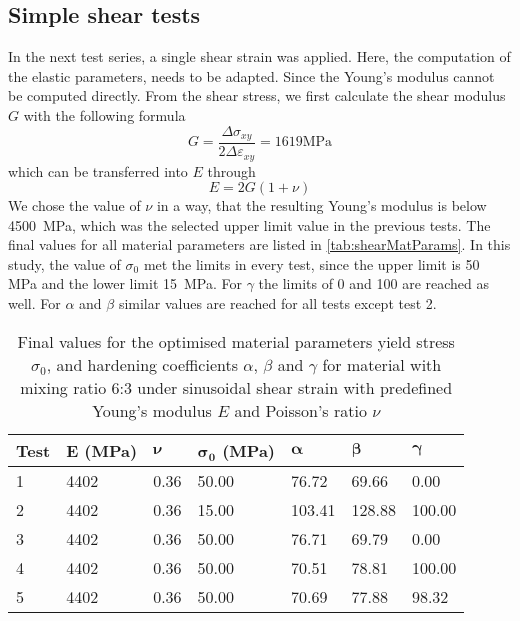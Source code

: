 \subsection{Simple shear tests}
In the next test series, a single shear strain was applied. Here, the computation of the elastic parameters, needs to be adapted. Since the Young's modulus cannot be computed directly. From the shear stress, we first calculate the shear modulus $G$ with the following formula
\begin{equation}
    G = \frac{\Delta\sigma_{xy}}{2\Delta\varepsilon_{xy}} = 1619 \text{MPa}
\end{equation}
which can be transferred into $E$ through
\begin{equation}
    E = 2G(1+\nu) 
\end{equation}
We chose the value of $\nu$ in a way, that the resulting Young's modulus is below 4500 MPa, which was the selected upper limit value in the previous tests. The final values for all material parameters are listed in \autoref{tab:shearMatParams}. In this study, the value of $\sigma_0$ met the limits in every test, since the upper limit is 50 MPa and the lower limit 15 MPa. For $\gamma$ the limits of 0 and 100 are reached as well. For $\alpha$ and $\beta$ similar values are reached for all tests except test 2. 

\begin{table}[h!]
\centering
\caption{Final values for the optimised material parameters yield stress $\sigma_0$, and hardening coefficients $\alpha$, $\beta$ and $\gamma$ for material with mixing ratio 6:3 under sinusoidal shear strain with predefined Young's modulus $E$ and Poisson's ratio $\nu$}
\label{tab:shearMatParams}
\renewcommand{\arraystretch}{1.1}
\begin{tabular}{L{0.08\textwidth}|C{0.08\textwidth}C{0.08\textwidth}C{0.08\textwidth}C{0.08\textwidth}C{0.08\textwidth}C{0.08\textwidth}}
\toprule
\textbf{Test} & \textbf{E (MPa)} & $\boldsymbol{\nu}$ & $\boldsymbol{\sigma_0}$ \textbf{(MPa)} & $\boldsymbol{\alpha}$ & $\boldsymbol{\beta}$ & $\boldsymbol{\gamma}$ \\
 & 4402 & 0.36 & 50.00 & 76.72 & 69.66 & 0.00 \\
2 & 4402 & 0.36 & 15.00 & 103.41 & 128.88 & 100.00 \\
3 & 4402 & 0.36 & 50.00 & 76.71 & 69.79 & 0.00 \\
4 & 4402 & 0.36 & 50.00 & 70.51 & 78.81 & 100.00  \\
5 & 4402 & 0.36 & 50.00 & 70.69 & 77.88 & 98.32 \\
\bottomrule
\end{tabular}
\end{table}

